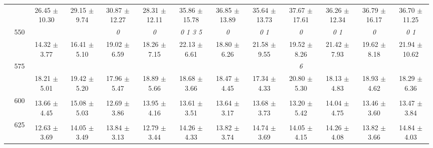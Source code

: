 \begin{table}[h]
{\begin{tabular}{
        ccccccccccccc}
 & & \cellcolor[HTML]{EFEFEF} 26.45 $\pm$ 10.30& \cellcolor[HTML]{EFEFEF} 29.15 $\pm$ 9.74& \cellcolor[HTML]{EFEFEF} 30.87 $\pm$ 12.27& \cellcolor[HTML]{EFEFEF} 28.31 $\pm$ 12.11& \cellcolor[HTML]{EFEFEF} 35.86 $\pm$ 15.78& \cellcolor[HTML]{EFEFEF} 36.85 $\pm$ 13.89& \cellcolor[HTML]{EFEFEF} 35.64 $\pm$ 13.73& \cellcolor[HTML]{EFEFEF} 37.67 $\pm$ 17.61& \cellcolor[HTML]{EFEFEF} 36.26 $\pm$ 12.34& \cellcolor[HTML]{EFEFEF} 36.79 $\pm$ 16.17& \cellcolor[HTML]{EFEFEF} 36.70 $\pm$ 11.25 \\ 
 & \multirow{2}{*}{550}& & & \textit{ 0 }& \textit{ 0 }& \textit{ 0 1 3 5 }& \textit{ 0 }& \textit{ 0 1 }& \textit{ 0 }& \textit{ 0 1 }& \textit{ 0 }& \textit{ 0 1 } \\ 
 & & 14.32 $\pm$ 3.77& 16.41 $\pm$ 5.10& 19.02 $\pm$ 6.59& 18.26 $\pm$ 7.15& 22.13 $\pm$ 6.61& 18.80 $\pm$ 6.26& 21.58 $\pm$ 9.55& 19.52 $\pm$ 8.26& 21.42 $\pm$ 7.93& 19.62 $\pm$ 8.18& 21.94 $\pm$ 10.62 \\ 
 & \multirow{2}{*}{575}& \cellcolor[HTML]{EFEFEF} & \cellcolor[HTML]{EFEFEF} & \cellcolor[HTML]{EFEFEF} & \cellcolor[HTML]{EFEFEF} & \cellcolor[HTML]{EFEFEF} & \cellcolor[HTML]{EFEFEF} & \cellcolor[HTML]{EFEFEF} & \cellcolor[HTML]{EFEFEF} \textit{ 6 }& \cellcolor[HTML]{EFEFEF} & \cellcolor[HTML]{EFEFEF} & \cellcolor[HTML]{EFEFEF}  \\ 
 & & \cellcolor[HTML]{EFEFEF} 18.21 $\pm$ 5.01& \cellcolor[HTML]{EFEFEF} 19.42 $\pm$ 5.20& \cellcolor[HTML]{EFEFEF} 17.96 $\pm$ 5.47& \cellcolor[HTML]{EFEFEF} 18.89 $\pm$ 5.66& \cellcolor[HTML]{EFEFEF} 18.68 $\pm$ 3.66& \cellcolor[HTML]{EFEFEF} 18.47 $\pm$ 4.45& \cellcolor[HTML]{EFEFEF} 17.34 $\pm$ 4.33& \cellcolor[HTML]{EFEFEF} 20.80 $\pm$ 5.30& \cellcolor[HTML]{EFEFEF} 18.13 $\pm$ 4.83& \cellcolor[HTML]{EFEFEF} 18.93 $\pm$ 4.62& \cellcolor[HTML]{EFEFEF} 18.29 $\pm$ 6.36 \\ 
 & \multirow{2}{*}{600}& & & & & & & & & & &  \\ 
 & & 13.66 $\pm$ 4.45& 15.08 $\pm$ 5.03& 12.69 $\pm$ 3.86& 13.95 $\pm$ 4.16& 13.61 $\pm$ 3.51& 13.64 $\pm$ 3.17& 13.68 $\pm$ 3.73& 13.20 $\pm$ 5.42& 14.04 $\pm$ 4.75& 13.46 $\pm$ 3.60& 13.47 $\pm$ 3.84 \\ 
 & \multirow{2}{*}{625}& \cellcolor[HTML]{EFEFEF} & \cellcolor[HTML]{EFEFEF} & \cellcolor[HTML]{EFEFEF} & \cellcolor[HTML]{EFEFEF} & \cellcolor[HTML]{EFEFEF} & \cellcolor[HTML]{EFEFEF} & \cellcolor[HTML]{EFEFEF} & \cellcolor[HTML]{EFEFEF} & \cellcolor[HTML]{EFEFEF} & \cellcolor[HTML]{EFEFEF} & \cellcolor[HTML]{EFEFEF}  \\ 
 & & \cellcolor[HTML]{EFEFEF} 12.63 $\pm$ 3.69& \cellcolor[HTML]{EFEFEF} 14.05 $\pm$ 3.49& \cellcolor[HTML]{EFEFEF} 13.84 $\pm$ 3.13& \cellcolor[HTML]{EFEFEF} 12.79 $\pm$ 3.44& \cellcolor[HTML]{EFEFEF} 14.26 $\pm$ 4.33& \cellcolor[HTML]{EFEFEF} 13.82 $\pm$ 3.74& \cellcolor[HTML]{EFEFEF} 14.74 $\pm$ 3.69& \cellcolor[HTML]{EFEFEF} 14.05 $\pm$ 4.15& \cellcolor[HTML]{EFEFEF} 14.26 $\pm$ 4.08& \cellcolor[HTML]{EFEFEF} 13.82 $\pm$ 3.66& \cellcolor[HTML]{EFEFEF} 14.84 $\pm$ 4.03 \\ 

\end{tabular}}
\end{table}
